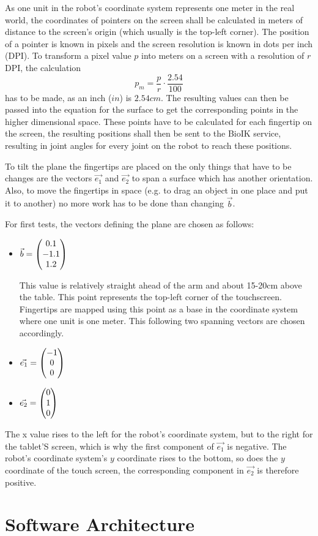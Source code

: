 As one unit in the robot's coordinate system represents one meter in the real world, the coordinates of pointers on the screen shall be calculated in meters of distance to the screen's origin (which usually is the top-left corner). The position of a pointer is known in pixels and the screen resolution is known in dots per inch (DPI). To transform a pixel value $p$ into meters on a screen with a resolution of $r$ DPI, the calculation
\begin{equation*}
p_m = \frac{p}{r} \cdot \frac{2.54}{100}
\end{equation*}
has to be made, as an inch ($in$) is $2.54cm$. The resulting values can then be passed into the equation for the surface to get the corresponding points in the higher dimensional space. These points have to be calculated for each fingertip on the screen, the resulting positions shall then be sent to the BioIK service, resulting in joint angles for every joint on the robot to reach these positions.

To tilt the plane the fingertips are placed on the only things that have to be changes are the vectors $\vec{e_1}$ and $\vec{e_2}$ to span a surface which has another orientation. Also, to move the fingertips in space (e.g. to drag an object in one place and put it to another) no more work has to be done than changing $\vec{b}$. 

For first tests, the vectors defining the plane are chosen as follows:
\begin{itemize}
	\item $\vec{b} = \left( \begin{matrix} 0.1 \\ -1.1 \\ 1.2 \end{matrix} \right)$
	
	This value is relatively straight ahead of the arm and about 15-20cm above the table. This point represents the top-left corner of the touchscreen. Fingertips are mapped using this point as a base in the coordinate system where one unit is one meter. This following two spanning vectors are chosen accordingly.
	\item $\vec{e_1} = \left( \begin{matrix} -1 \\ 0 \\ 0 \end{matrix} \right)$
	\item $\vec{e_2} = \left( \begin{matrix} 0 \\ 1 \\ 0 \end{matrix} \right)$
\end{itemize}

The x value rises to the left for the robot's coordinate system, but to the right for the tablet'S screen, which is why the first component of $\vec{e_1}$ is negative. The robot's coordinate system's $y$ coordinate rises to the bottom, so does the $y$ coordinate of the touch screen, the corresponding component in $\vec{e_2}$ is therefore positive.


\section{Software Architecture}